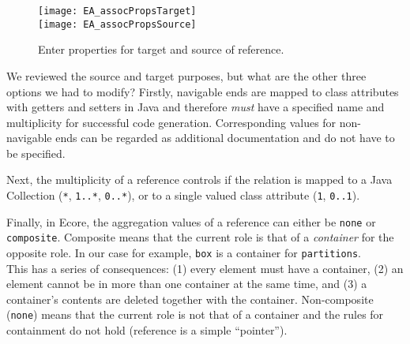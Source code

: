 \begin{itemize}
\vspace{0.5cm}

\begin{figure}[htbp]
	\centering
	  \texttt{[image: EA\_assocPropsTarget]}\\
  \vspace{1cm}
    \texttt{[image: EA\_assocPropsSource]}
	\caption{Enter properties for target and source of reference.}
	\label{fig:reference_ends}
\end{figure}
\FloatBarrier

\end{itemize}

We reviewed the source and target purposes, but what are the other three options we had to modify? Firstly, navigable ends are mapped to class attributes with getters and setters in Java and therefore \emph{must} have a specified name and  multiplicity for successful code generation. Corresponding values for non-navigable ends can  be regarded as additional documentation and do not have to be specified.

Next, the multiplicity of a reference controls if the relation is mapped to a Java Collection (\texttt{*},  \texttt{1..*}, \texttt{0..*}), or to a single valued class attribute (\texttt{1}, \texttt{0..1}).

Finally, in Ecore, the aggregation values of a reference can either be \texttt{none} or \texttt{com\-po\-site}.
Composite means that the current role is that of a \emph{container} for the opposite role.
In our case for example, \texttt{box} is a container for \texttt{partitions}.\\
This has a series of consequences: (1) every element must have a container, (2) an element cannot be in more than one container at the same time, and (3) a container's contents are deleted together with the container.
Non-composite (\texttt{none}) means that the current role is not that of a container and the rules for containment do not hold (reference is a simple ``pointer'').

